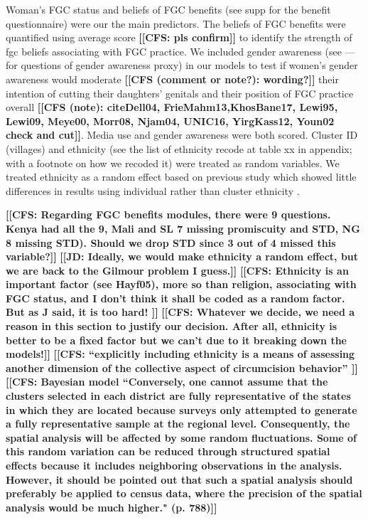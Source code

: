 \documentclass[12pt,]{article}
\newcommand{\comment}[1]{\textbf{[[#1]]}}
\newcommand{\cfcmt}[1]{\comment{CFS: #1}}
\newcommand{\cfonly}[1]{\comment{CFS (note): #1}}
\newcommand{\cf}[1]{\comment{CFS (comment or note?): #1}}
\newcommand{\jdcmt}[1]{\comment{JD: #1}}
\begin{document}
Woman's FGC status and beliefs of FGC benefits (see supp for the benefit questionnaire) were our the main predictors.  The beliefs of FGC benefits were quantified using average score \cfcmt{pls confirm} to identify the strength of fgc beliefs associating with FGC practice.  We included gender awareness (see — for questions of gender awareness proxy) in our models to test if women’s gender awareness would moderate \cf{wording?} their intention of cutting their daughters’ genitals and their position of FGC practice overall \cfonly{cite{Dell04, FrieMahm13,KhosBane17, Lewi95, Lewi09, Meye00, Morr08, Njam04, UNIC16, YirgKass12, Youn02} check and cut}.  Media use and gender awareness were both scored.  Cluster ID (villages) and ethnicity (see the list of ethnicity recode at table xx in appendix; with a footnote on how we recoded it) were treated as random variables.  We treated ethnicity as a random effect based on previous study which showed little differences in results using individual rather than cluster ethnicity \cite{Hayf05}.

\cfcmt{Regarding FGC benefits modules, there were 9 questions.  Kenya had all the 9, Mali and SL 7 missing promiscuity and STD, NG 8 missing STD).  Should we drop STD since 3 out of 4 missed this variable?}
\jdcmt{Ideally, we would make ethnicity a random effect, but we are back to the Gilmour problem I guess.} \cfcmt{Ethnicity is an important factor (see Hayf05), more so than religion, associating with FGC status, and I don't think it shall be coded as a random factor.  But as J said, it is too hard! } \cfcmt{Whatever we decide, we need a reason in this section to justify our decision. After all, ethnicity is better to be a fixed factor but we can’t due to it breaking down the models!}
\cfcmt{“explicitly including ethnicity is a means of assessing another dimension of the collective aspect of circumcision behavior” \cite{Hayf05}}
\cfcmt{Bayesian model \cite{KandNwak09} “Conversely, one cannot assume that the clusters selected in each district are fully representative of the states in which they are located because surveys only attempted to generate a fully representative sample at the regional level. Consequently, the spatial analysis will be affected by some random fluctuations.  Some of this random variation can be reduced through structured spatial effects because it includes neighboring observations in the analysis. However, it should be pointed out that such a spatial analysis should preferably be applied to census data, where the precision of the spatial analysis would be much higher." (p. 788)}
\end{document}
